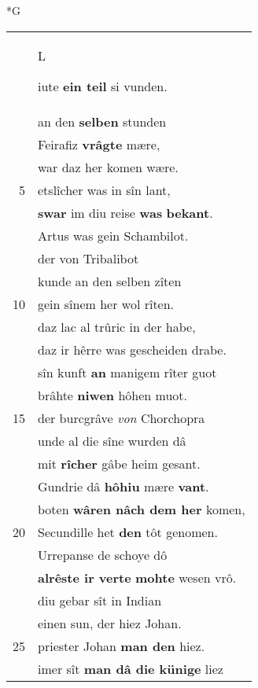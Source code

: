 \documentclass[8pt,a4paper,notitlepage]{article}
\begin{document}
\begin{table}[ht]
\begin{minipage}[t]{0.5\linewidth}
\end{minipage}
\end{table}
\newpage
\begin{table}[ht]
\begin{minipage}[t]{0.5\linewidth}
\small
\begin{center}*G
\end{center}
\begin{tabular}{rl}
 & \begin{large}L\end{large}iute \textbf{ein teil} si vunden.\\ 
 & an den \textbf{selben} stunden\\ 
 & Feirafiz \textbf{vrâgte} mære,\\ 
 & war daz her komen wære.\\ 
5 & etslîcher was in sîn lant,\\ 
 & \textbf{swar} im diu reise \textbf{was} \textbf{bekant}.\\ 
 & Artus was gein Schambilot.\\ 
 & der von Tribalibot\\ 
 & kunde an den selben zîten\\ 
10 & gein sînem her wol rîten.\\ 
 & daz lac al trûric in der habe,\\ 
 & daz ir hêrre was gescheiden drabe.\\ 
 & sîn kunft \textbf{an} manigem rîter guot\\ 
 & brâhte \textbf{niwen} hôhen muot.\\ 
15 & der burcgrâve \textit{von} Chorchopra\\ 
 & unde al die sîne wurden dâ\\ 
 & mit \textbf{rîcher} gâbe heim gesant.\\ 
 & Gundrie dâ \textbf{hôhiu} mære \textbf{vant}.\\ 
 & boten \textbf{wâren nâch dem her} komen,\\ 
20 & Secundille het \textbf{den} tôt genomen.\\ 
 & Urrepanse de schoye dô\\ 
 & \textbf{alrêste ir verte} \textbf{mohte} wesen vrô.\\ 
 & diu gebar sît in Indian\\ 
 & einen sun, der hiez Johan.\\ 
25 & priester Johan \textbf{man den} hiez.\\ 
 & imer sît \textbf{man dâ die künige} liez\\ 

\end{tabular}
\end{minipage}
\end{table}
\end{document}
